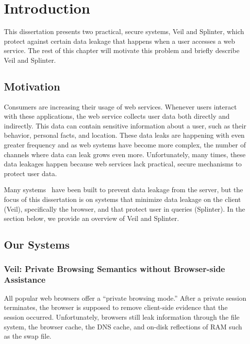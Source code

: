 \section{Introduction}
\label{chap:intro}

This dissertation presents two practical, secure
systems, Veil and Splinter, which protect against
certain data leakage that happens when a user
accesses a web service. The rest of this
chapter will motivate this problem and 
briefly describe Veil and Splinter.

\subsection{Motivation}
Consumers are increasing their usage of web services. Whenever
users interact with these applications, the web service collects
user data both directly and indirectly. This data can contain sensitive 
information about a user, such as their behavior, personal facts,
and location. These data leaks are happening with even greater
frequency and as web systems have become more complex, the number
of channels where data can leak grows even more. Unfortunately,
many times, these data leakages happen because web services
lack practical, secure mechanisms to protect user data. 

Many systems~\cite{popa:mylar, popa:cryptdb, opaque} 
have been built to prevent
data leakage from the server, but
the focus of this dissertation is on systems
that minimize data leakage on the client (Veil), specifically
the browser, and that protect user in queries (Splinter).
In the section below, we provide an overview of Veil and Splinter.

\subsection{Our Systems}

\subsubsection{Veil: Private Browsing Semantics without Browser-side Assistance}
All popular web browsers offer a ``private browsing
mode.'' After a private session terminates, the
browser is supposed to remove client-side
evidence that the session occurred. Unfortunately,
browsers still leak information through the file
system, the browser cache, the DNS cache, and
on-disk reflections of RAM such as the swap file.

